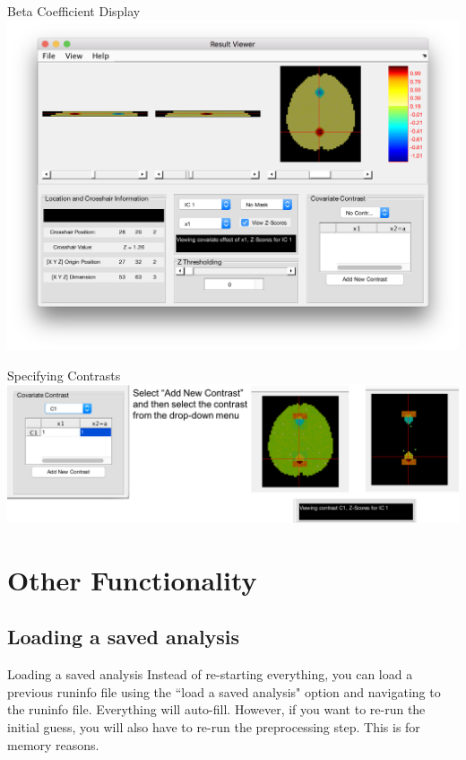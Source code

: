 \documentclass[11pt]{beamer}
\begin{document}
\begin{frame}{Beta Coefficient Display}
		\includegraphics[width=1\linewidth]{figs/betaViewer}
\end{frame}

\begin{frame}{Specifying Contrasts}
		\includegraphics[width=1\linewidth]{figs/contrastExample}
\end{frame}

\section{Other Functionality}

\subsection{Loading a saved analysis}
\begin{frame}{Loading a saved analysis}
Instead of re-starting everything, you can load a previous runinfo file using the ``load a saved analysis" option and navigating to the runinfo file. Everything will auto-fill. However, if you want to re-run the initial guess, you will also have to re-run the preprocessing step. This is for memory reasons.
\end{frame}
\end{document}
